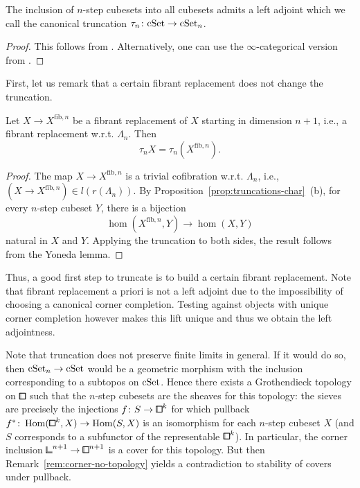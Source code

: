 \begin{proposition}\label{prop:step-left-adjoint}
The inclusion of $n$-step cubesets into all cubesets admits a left adjoint which we call the canonical truncation $\tau_n\colon\mathrm{cSet}\to\mathrm{cSet}_n$.
\end{proposition}

\begin{proof}
This follows from \cite[Theorem 1.39]{Adamek1994}.
Alternatively, one can use the $\infty$-categorical version from \cite[Proposition 5.5.4.2]{Lurie2009}.
\end{proof}

First, let us remark that a certain fibrant replacement does not change the truncation.

\begin{lemma}
	Let $X\to X^{\mathrm{fib},n}$ be a fibrant replacement of $X$ starting in dimension $n+1$,
	i.e., a fibrant replacement w.r.t. $\Lambda_n$.
	Then
	\[
	    \tau_{n}X=\tau_n (X^{\mathrm{fib},n}).
	\]
\end{lemma}

\begin{proof}
The map $X\to X^{\mathrm{fib},n}$ is a trivial cofibration w.r.t. $\Lambda_n$,
i.e., $(X\to X^{\mathrm{fib},n})\in l(r(\Lambda_n))$.
By Proposition~\ref{prop:truncations-char}~(b), for every $n$-step cubeset $Y$, there is a bijection
\[
    \hom(X^{\mathrm{fib},n},Y) \to \hom(X,Y)
\]
natural in $X$ and $Y$.
Applying the truncation to both sides, the result follows from the Yoneda lemma.
\end{proof}

Thus, a good first step to truncate is to build a certain fibrant replacement.
Note that fibrant replacement a priori is not a left adjoint due to the impossibility of choosing a canonical corner completion.
Testing against objects with unique corner completion however makes this lift unique and thus we obtain the left adjointness.

\begin{remark}
Note that truncation does not preserve finite limits in general.
If it would do so, then $\mathrm{cSet}_n\to\mathrm{cSet}$ would be a geometric morphism
with the inclusion corresponding to a subtopos on $\mathrm{cSet}$.
Hence there exists a Grothendieck topology on $\bbox$ such that the $n$-step cubesets are the sheaves for this topology:
the sieves are precisely the injections $f\colon S\to{\bbox}^k$ for which pullback $f^\ast\colon\hom({\bbox}^k,X)\to\hom(S,X)$
is an isomorphism for each $n$-step cubeset $X$ (and $S$ corresponds to a subfunctor of the representable ${\bbox}^k$).
In particular, the corner inclusion ${\bbcor}^{n+1}\to{\bbox}^{n+1}$ is a cover for this topology.
But then Remark~\ref{rem:corner-no-topology} yields a contradiction to stability of covers under pullback.
\end{remark}

